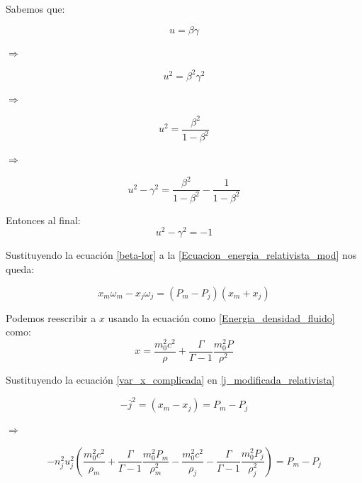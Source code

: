\documentclass[12pt,a4paper]{book}
\begin{document}
Sabemos que:

\begin{equation}
u = \beta \gamma
\end{equation}

$\Rightarrow$

\begin{equation}
u^2 = \beta^2 \gamma^2 
\end{equation}

$\Rightarrow$

\begin{equation}
u^2 = \frac{\beta^2}{1-\beta^2} 
\end{equation}

$\Rightarrow$

\begin{equation}
u^2-\gamma^2 = \frac{\beta^2}{1-\beta^2}-\frac{1}{1-\beta^2}
\end{equation}

Entonces al final:
\begin{equation} \label{beta-lor}
u^2-\gamma^2 = -1
\end{equation}

Sustituyendo la ecuación \ref{beta-lor} a la \ref{Ecuacion_energia_relativista_mod} nos queda:

\begin{equation} \label{Choque adiabatico}
x_m \omega_m- x_j \omega_j = \left( P_m-P_j \right) \left( x_m+x_j \right) 
\end{equation}

Podemos reescribir a $x$ usando la ecuación  como \ref{Energia_densidad_fluido} como:
\begin{equation} \label{var_x_complicada}
x= \frac{m_0^2 c^2}{\rho}+ \frac{\Gamma}{\Gamma-1}\frac{m_0^2 P}{\rho^2}
\end{equation}

Sustituyendo la ecuación \ref{var_x_complicada} en \ref{j_modificada_relativista}

\begin{equation}
-\overline{j}^{2} = \left( x_m - x_j \right) = P_m - P_j
\end{equation}

$\Rightarrow$

\begin{equation}
-n_j^2 u_j^2 \left(\frac{m_0^2 c^2}{\rho_m} +
\frac{\Gamma}{\Gamma-1} \frac{m_0^2 P_m}{\rho_m^2}-
\frac{m_0^2 c^2}{\rho_j}-
\frac{\Gamma}{\Gamma-1} \frac{m_0^2 P_j}{\rho_j^2} \right) = 
P_m - P_j
\end{equation}
\end{document}
